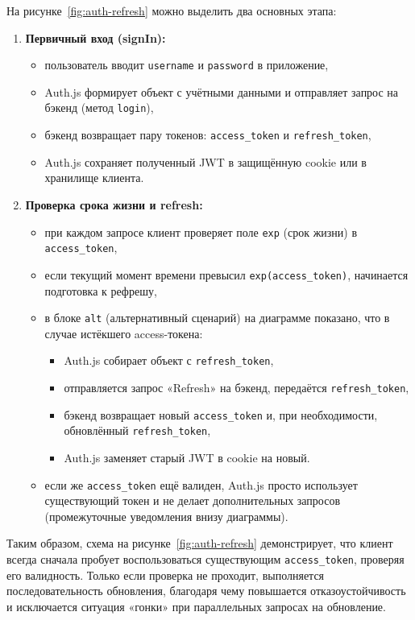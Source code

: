 На рисунке~\ref{fig:auth-refresh} можно выделить два основных этапа:
\begin{enumerate}
    \item \textbf{Первичный вход (sign\-In):}
    \begin{itemize}
        \item пользователь вводит \texttt{username} и \texttt{password} в приложение,
        \item Auth.js формирует объект с учётными данными и отправляет запрос на бэкенд (метод \texttt{login}),
        \item бэкенд возвращает пару токенов: \texttt{access\_token} и \texttt{refresh\_token},
        \item Auth.js сохраняет полученный JWT в защищённую cookie или в хранилище клиента.
    \end{itemize}
    \item \textbf{Проверка срока жизни и refresh:}
    \begin{itemize}
        \item при каждом запросе клиент проверяет поле \texttt{exp} (срок жизни) в \texttt{access\_token},
        \item если текущий момент времени превысил \texttt{exp(access\_token)}, начинается подготовка к рефрешу,
        \item в блоке \texttt{alt} (альтернативный сценарий) на диаграмме показано, что в случае истёкшего access-токена:
        \begin{itemize}
            \item Auth.js собирает объект с \texttt{refresh\_token},
            \item отправляется запрос «Refresh» на бэкенд, передаётся \texttt{refresh\_token},
            \item бэкенд возвращает новый \texttt{access\_token} и, при необходимости, обновлённый \texttt{refresh\_token},
            \item Auth.js заменяет старый JWT в cookie на новый.
        \end{itemize}
        \item если же \texttt{access\_token} ещё валиден, Auth.js просто использует существующий токен и не делает дополнительных запросов (промежуточные уведомления внизу диаграммы).
    \end{itemize}
\end{enumerate}

Таким образом, схема на рисунке~\ref{fig:auth-refresh} демонстрирует, что клиент всегда сначала пробует воспользоваться существующим \texttt{access\_token}, проверяя его валидность. Только если проверка не проходит, выполняется последовательность обновления, благодаря чему повышается отказоустойчивость и исключается ситуация «гонки» при параллельных запросах на обновление.

